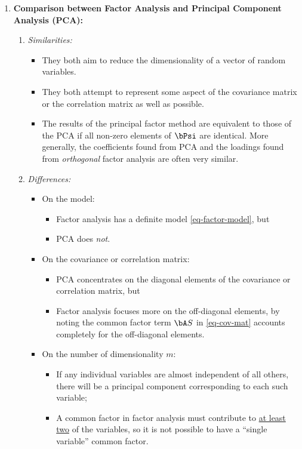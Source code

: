 \documentclass[12pt]{article}
\begin{document}
\begin{enumerate}[label=\textbf{\arabic*.}]
	\item \textbf{Comparison between Factor Analysis and Principal Component Analysis (PCA):} 
	\begin{enumerate}
		\item \textit{Similarities:}
		\begin{itemize}
			
			\item They both aim to reduce the dimensionality of a vector of random variables. 
			
			\item They both attempt to represent some aspect of the covariance matrix or the correlation matrix as well as possible. 
			
			\item The results of the principal factor method are equivalent to those of the PCA if all non-zero elements of $\bPsi$ are identical. More generally, the coefficients found from PCA and the loadings found from \emph{orthogonal} factor analysis are often very similar. 
			
		\end{itemize}
		
		\item \textit{Differences:}
		\begin{itemize}
			\item On the model: 
			\begin{itemize}
				\item Factor analysis has a definite model \eqref{eq-factor-model}, but 
				\item PCA does \emph{not}. 
			\end{itemize}
			
			\item On the covariance or correlation matrix: 
			\begin{itemize}
				\item PCA concentrates on the diagonal elements of the covariance or correlation matrix, but 
				\item Factor analysis focuses more on the off-diagonal elements, by noting the common factor term $\bA S$ in \eqref{eq-cov-mat} accounts completely for the off-diagonal elements. 
			\end{itemize}
			
			\item On the number of dimensionality $m$: 
			\begin{itemize}
				\item If any individual variables are almost independent of all others, there will be a principal component corresponding to each such variable; 
				\item A common factor in factor analysis must contribute to \underline{at least two} of the variables, so it is not possible to have a ``single variable'' common factor. 
			\end{itemize}
			

\end{itemize}
\end{enumerate}
\end{enumerate}
\end{document}
